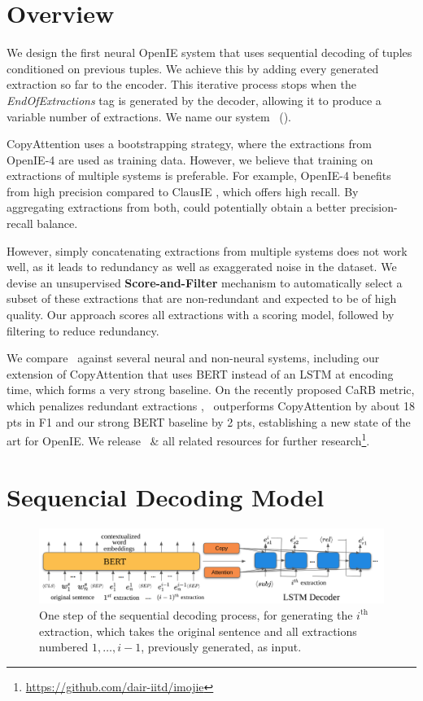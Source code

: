 
\section{Overview}

    We design the first neural OpenIE system that uses sequential decoding of tuples conditioned on previous tuples. We achieve this by adding every generated extraction so far to the encoder. This iterative process stops when the \textit{EndOfExtractions} tag is generated by the decoder, allowing it to produce a variable number of extractions. We name our system \boldlongname\ (\boldshortname).

    CopyAttention uses a bootstrapping strategy, where the extractions from  OpenIE-4 \cite{christensen&al11,pal&al16} are used as training data. However, we believe that training on extractions of multiple systems is preferable. For example, OpenIE-4 benefits from high precision compared to ClausIE \cite{corro&al13}, which offers high recall. By aggregating extractions from both, \shortname{} could potentially obtain a better precision-recall balance.

    However, simply concatenating extractions from multiple systems does not work well, as it leads to redundancy as well as exaggerated noise in the dataset. 
    We devise an unsupervised \textbf{Score-and-Filter} mechanism to automatically select a subset of these extractions that are non-redundant and expected to be of high quality. Our approach scores all extractions with a scoring model, followed by filtering to reduce redundancy.

    We compare \shortname\ against several neural and non-neural systems, including our extension of CopyAttention that uses BERT \cite{devlin&al19} instead of an LSTM at encoding time, which forms a very strong baseline. On the recently proposed CaRB metric, which penalizes redundant extractions \cite{bhardwaj&al19}, \shortname\ outperforms CopyAttention by about 18 pts in F1 and our strong BERT baseline by 2 pts, establishing a new state of the art for OpenIE. We release \shortname\ \& all related resources for further research\footnote{\protect\url{https://github.com/dair-iitd/imojie}}.

\section{Sequencial Decoding Model}

    \begin{figure}[h]
    \includegraphics[width=.99\hsize]{images/imojie/model.png}
    \caption{One step of the sequential decoding process, for generating the $i^\text{th}$ extraction, which takes the original sentence and all extractions numbered $1,\ldots,i-1$, previously generated, as input.}
    \label{fig:seq_dec}
    \end{figure}

